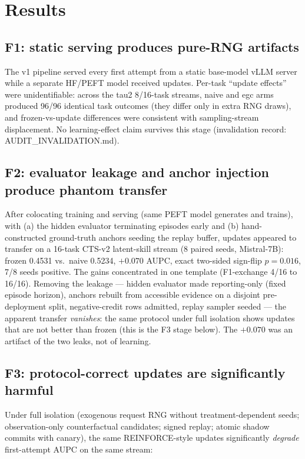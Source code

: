 \section{Results}

\subsection{F1: static serving produces pure-RNG artifacts}
The v1 pipeline served every first attempt from a static base-model
vLLM server while a separate HF/PEFT model received updates. Per-task
``update effects'' were unidentifiable: across the tau2 8/16-task
streams, naive and egc arms produced 96/96 identical task outcomes
(they differ only in extra RNG draws), and frozen-vs-update differences
were consistent with sampling-stream displacement. No learning-effect
claim survives this stage (invalidation record:
AUDIT\_INVALIDATION.md).

\subsection{F2: evaluator leakage and anchor injection produce phantom transfer}
After colocating training and serving (same PEFT model generates and
trains), with (a) the hidden evaluator terminating episodes early and
(b) hand-constructed ground-truth anchors seeding the replay buffer,
updates appeared to transfer on a 16-task CTS-v2 latent-skill stream
(8 paired seeds, Mistral-7B): frozen 0.4531 vs.\ naive 0.5234,
$+0.070$ AUPC, exact two-sided sign-flip $p{=}0.016$, 7/8 seeds
positive. The gains concentrated in one template (F1-exchange 4/16 to
16/16). Removing the leakage --- hidden evaluator made reporting-only
(fixed episode horizon), anchors rebuilt from accessible evidence on a
disjoint pre-deployment split, negative-credit rows admitted, replay
sampler seeded --- the apparent transfer \emph{vanishes}: the same
protocol under full isolation shows updates that are not better than
frozen (this is the F3 stage below). The $+0.070$ was an artifact of
the two leaks, not of learning.

\subsection{F3: protocol-correct updates are significantly harmful}
Under full isolation (exogenous request RNG without treatment-dependent
seeds; observation-only counterfactual candidates; signed replay;
atomic shadow commits with canary), the same REINFORCE-style updates
significantly \emph{degrade} first-attempt AUPC on the same stream:

